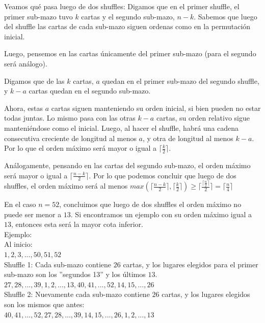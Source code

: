 \documentclass[a4paper]{article}
\begin{document}
Veamos qué pasa luego de dos shuffles:
Digamos que en el primer shuffle, el primer sub-mazo tuvo $k$ cartas y el segundo sub-mazo, $n-k$.
Sabemos que luego del shuffle las cartas de cada sub-mazo siguen ordenas como en la permutación inicial.

Luego, pensemos en las cartas únicamente del primer sub-mazo (para el segundo será análogo).

Digamos que de las $k$ cartas, $a$ quedan en el primer sub-mazo del segundo shuffle, y $k-a$ cartas quedan en el segundo sub-mazo.

Ahora, estas $a$ cartas siguen manteniendo su orden inicial, si bien pueden no estar todas juntas. Lo mismo pasa con las otras $k-a$ cartas, su orden relativo sigue manteniéndose como el inicial.
Luego, al hacer el shuffle, habrá una cadena consecutiva creciente de longitud al menos $a$, y otra de longitud al menos $k-a$. Por lo que el orden máximo será mayor o igual a $\lceil \frac{k}{2}\rceil$.

Análogamente, pensando en las cartas del segundo sub-mazo, el orden máximo será mayor o igual a $\lceil \frac{n-k}{2}\rceil$. Por lo que podemos concluir que luego de dos shuffles, el orden máximo será al menos $max(\lceil \frac{n-k}{2}\rceil, \lceil \frac{k}{2}\rceil) \geq \lceil \frac{\lceil \frac{n}{2}\rceil}{2} \rceil = \lceil \frac{n}{4}\rceil$

En el caso $n=52$, concluimos que luego de dos shuffles el orden máximo no puede ser menor a $13$. Si encontramos un ejemplo con su orden máximo igual a $13$, entonces esta será la mayor cota inferior.\\

Ejemplo:\\

Al inicio:\\

$1, 2, 3, ..., 50, 51, 52$\\

Shuffle 1: Cada sub-mazo contiene $26$ cartas, y los lugares elegidos para el primer sub-mazo son los ''segundos 13'' y los últimos $13$.\\

$27, 28, ..., 39, 1, 2, ..., 13, 40, 41, ..., 52, 14, 15, ..., 26$\\

Shuffle 2: Nuevamente cada sub-mazo contiene $26$ cartas, y los lugares elegidos son los mismos que antes:\\

$40, 41, ..., 52, 27, 28, ..., 39, 14, 15, ..., 26, 1, 2, ..., 13$\\
\end{document}
